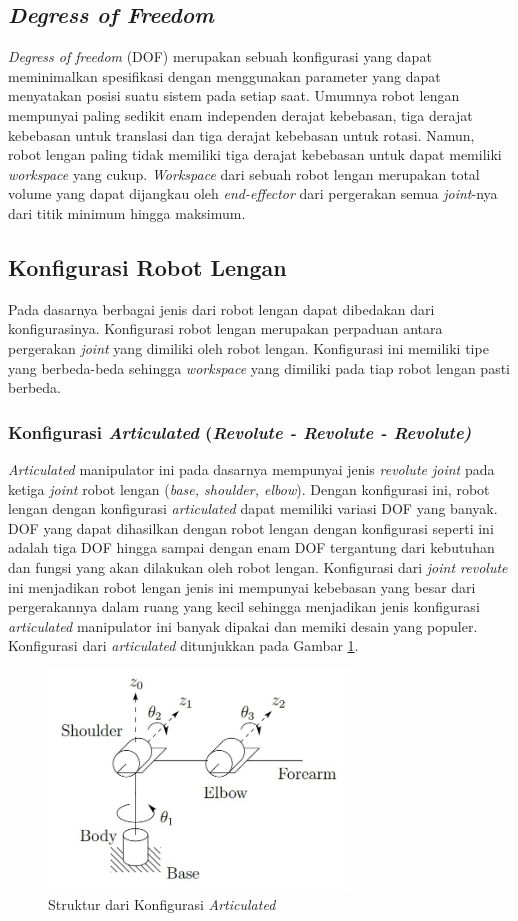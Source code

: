 \subsection{\emph{Degress of Freedom }}
\emph{Degress of freedom} (DOF) merupakan sebuah konfigurasi yang dapat meminimalkan spesifikasi dengan menggunakan parameter yang dapat menyatakan posisi suatu sistem pada setiap saat. Umumnya robot lengan mempunyai paling sedikit enam independen derajat kebebasan, tiga derajat kebebasan untuk translasi dan tiga derajat kebebasan untuk rotasi. Namun, robot lengan paling tidak memiliki tiga derajat kebebasan untuk dapat memiliki \emph{workspace} yang cukup. \emph{Workspace} dari sebuah robot lengan merupakan total volume yang dapat dijangkau oleh \emph{end-effector} dari pergerakan semua \emph{joint}-nya dari titik minimum hingga maksimum\cite{Spong2006}. 

\subsection{Konfigurasi Robot Lengan}
Pada dasarnya berbagai jenis dari robot lengan dapat dibedakan dari konfigurasinya. Konfigurasi robot lengan merupakan perpaduan antara pergerakan \emph{joint} yang dimiliki oleh robot lengan. Konfigurasi ini memiliki tipe yang berbeda-beda sehingga \emph {workspace} yang dimiliki pada tiap robot lengan pasti berbeda.

\subsubsection{Konfigurasi \emph{Articulated} (\emph{Revolute - Revolute - Revolute)}} 
\emph{Articulated} manipulator ini pada dasarnya mempunyai jenis \emph{revolute joint} pada ketiga \emph{joint} robot lengan (\emph {base, shoulder, elbow}). Dengan konfigurasi ini, robot lengan dengan konfigurasi \textit{articulated} dapat memiliki variasi DOF yang banyak. DOF yang dapat dihasilkan dengan robot lengan dengan konfigurasi seperti ini adalah tiga DOF hingga sampai dengan enam DOF tergantung dari kebutuhan dan fungsi yang akan dilakukan oleh robot lengan. Konfigurasi dari \textit{joint revolute} ini menjadikan robot lengan jenis ini mempunyai kebebasan yang besar dari pergerakannya dalam ruang yang kecil sehingga menjadikan jenis konfigurasi \textit{articulated} manipulator ini banyak dipakai dan memiki desain yang populer. Konfigurasi dari \textit{articulated} ditunjukkan pada Gambar \ref{pic.articulated}. 
\begin{figure}[H]
	\centering
	\includegraphics[width=8cm]{gambar/articulated.jpg}
	\caption{Struktur dari Konfigurasi  \textit{Articulated}\cite{Spong2006}}
	\label{pic.articulated}
\end{figure}
